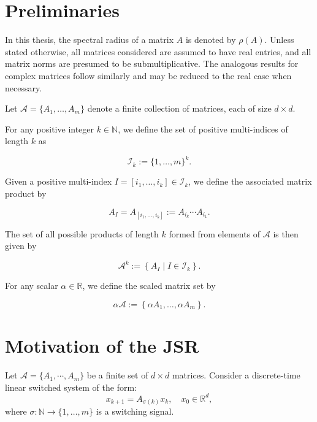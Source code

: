 \section{Preliminaries}

In this thesis, the spectral radius of a matrix $A$ is denoted by $\rho(A)$. Unless stated otherwise, all matrices considered are assumed to have real entries, and all matrix norms are presumed to be submultiplicative. The analogous results for complex matrices follow similarly and may be reduced to the real case when necessary.

Let $\mathcal{A} = \{A_1, \dots, A_m\}$ denote a finite collection of matrices, each of size $d \times d$.

For any positive integer $k \in \mathbb{N}$, we define the set of positive multi-indices of length $k$ as

$$
    \mathcal{I}_k := \{1, \dots, m\}^k.
$$

Given a positive multi-index $I = [i_1, \dots, i_k] \in \mathcal{I}_k$, we define the associated matrix product by

$$
    A_I = A_{[i_1, \dots, i_k]} := A_{i_k} \cdots A_{i_1}.
$$

The set of all possible products of length $k$ formed from elements of $\mathcal{A}$ is then given by

$$
    \mathcal{A}^k := \left\{ A_I \mid I \in \mathcal{I}_k \right\}.
$$

For any scalar $\alpha \in \mathbb{R}$, we define the scaled matrix set by

$$
    \alpha \mathcal{A} := \left\{ \alpha A_1, \dots, \alpha A_m \right\}.
$$

\section{Motivation of the JSR}

Let $\mathcal{A} = \{A_1, \cdots, A_m\}$ be a finite set of $d\times d$ matrices. 
Consider a discrete-time linear switched system of the form:
\begin{equation} \label{eq:switched_system}
x_{k+1} = A_{\sigma(k)} x_k, \quad x_0 \in \mathbb{R}^d,
\end{equation}
where $\sigma: \mathbb{N} \to \{1, \dots, m\}$ is a switching signal.

